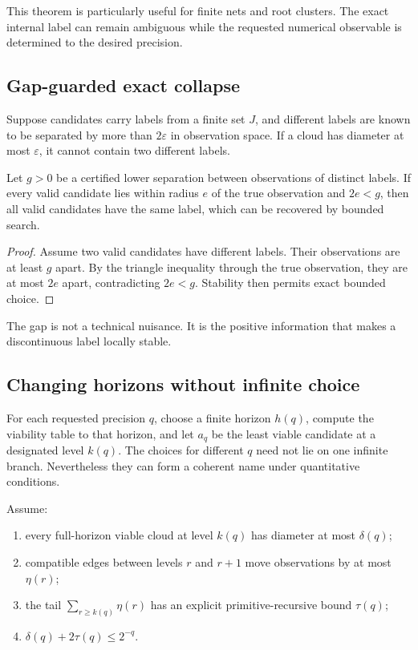 This theorem is particularly useful for finite nets and root clusters.  The exact internal label can remain ambiguous while the requested numerical observable is determined to the desired precision.

\subsection{Gap-guarded exact collapse}

Suppose candidates carry labels from a finite set \(J\), and different labels are known to be separated by more than \(2\varepsilon\) in observation space.  If a cloud has diameter at most \(\varepsilon\), it cannot contain two different labels.

\begin{theorem}\label{thm:gap-collapse}
Let \(g>0\) be a certified lower separation between observations of distinct labels.  If every valid candidate lies within radius \(e\) of the true observation and \(2e<g\), then all valid candidates have the same label, which can be recovered by bounded search.
\end{theorem}

\begin{proof}
Assume two valid candidates have different labels.  Their observations are at least \(g\) apart.  By the triangle inequality through the true observation, they are at most \(2e\) apart, contradicting \(2e<g\).  Stability then permits exact bounded choice.
\end{proof}

The gap is not a technical nuisance.  It is the positive information that makes a discontinuous label locally stable.

\subsection{Changing horizons without infinite choice}

For each requested precision \(q\), choose a finite horizon \(h(q)\), compute the viability table to that horizon, and let \(a_q\) be the least viable candidate at a designated level \(k(q)\).  The choices for different \(q\) need not lie on one infinite branch.  Nevertheless they can form a coherent name under quantitative conditions.

Assume:
\begin{enumerate}
\item every full-horizon viable cloud at level \(k(q)\) has diameter at most \(\delta(q)\);
\item compatible edges between levels \(r\) and \(r+1\) move observations by at most \(\eta(r)\);
\item the tail \(\sum_{r\ge k(q)}\eta(r)\) has an explicit primitive-recursive bound \(\tau(q)\);
\item \(\delta(q)+2\tau(q)\le 2^{-q}\).
\end{enumerate}

